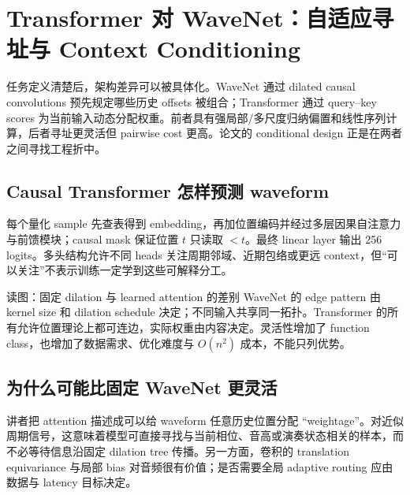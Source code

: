 \section{Transformer 对 WaveNet：自适应寻址与 Context Conditioning}

任务定义清楚后，架构差异可以被具体化。WaveNet 通过 dilated causal convolutions 预先规定哪些历史 offsets 被组合；Transformer 通过 query--key scores 为当前输入动态分配权重。前者具有强局部/多尺度归纳偏置和线性序列计算，后者寻址更灵活但 pairwise cost 更高。论文的 conditional design 正是在两者之间寻找工程折中。

\subsection{Causal Transformer 怎样预测 waveform}

每个量化 sample 先查表得到 embedding，再加位置编码并经过多层因果自注意力与前馈模块；causal mask 保证位置 $t$ 只读取 $<t$。最终 linear layer 输出 256 logits。多头结构允许不同 heads 关注周期邻域、近期包络或更远 context，但“可以关注”不表示训练一定学到这些可解释分工。


\begin{knowledgebox}{读图：固定 dilation 与 learned attention 的差别}
WaveNet 的 edge pattern 由 kernel size 和 dilation schedule 决定；不同输入共享同一拓扑。Transformer 的所有允许位置理论上都可连边，实际权重由内容决定。灵活性增加了 function class，也增加了数据需求、优化难度与 $O(n^2)$ 成本，不能只列优势。
\end{knowledgebox}

\subsection{为什么可能比固定 WaveNet 更灵活}

讲者把 attention 描述成可以给 waveform 任意历史位置分配 “weightage”。对近似周期信号，这意味着模型可直接寻找与当前相位、音高或演奏状态相关的样本，而不必等待信息沿固定 dilation tree 传播。另一方面，卷积的 translation equivariance 与局部 bias 对音频很有价值；是否需要全局 adaptive routing 应由数据与 latency 目标决定。


